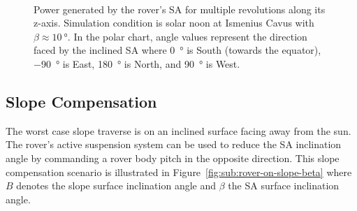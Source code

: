 \documentclass[twocolumn,letterpaper]{IEEEAerospaceCLS}  %
\newcommand{\refFig}[1]{{Figure}~\ref{#1}} %
\newlength{\subfigureWidth}
\begin{document}
\begin{figure}[h]
\begin{subfigure}[t]{\subfigureWidth}
    \label{fig:sub:simulation-data-rover-revolution-generated-power-polar-chart}
  \end{subfigure}\\[0.6ex]
  \caption{Power generated by the rover's \ac{SA} for multiple revolutions along its z-axis. Simulation condition is solar noon at Ismenius Cavus with $\beta \approx \SI{10}{\degree}$. In the polar chart, angle values represent the direction faced by the inclined \ac{SA} where \SI{0}{\degree} is South (towards the equator), \SI{-90}{\degree} is East, \SI{180}{\degree} is North, and \SI{90}{\degree} is West.}
  \label{fig:simulation-data-rover-revolution-generated-power}
\end{figure}

\subsection{Slope Compensation}

The worst case slope traverse is on an inclined surface facing away from the sun. The rover's active suspension system can be used to reduce the \ac{SA} inclination angle by commanding a rover body pitch in the opposite direction. This slope compensation scenario is illustrated in \refFig{fig:sub:rover-on-slope-beta} where $B$ denotes the slope surface inclination angle and $\beta$ the \ac{SA} surface inclination angle.
\end{document}
